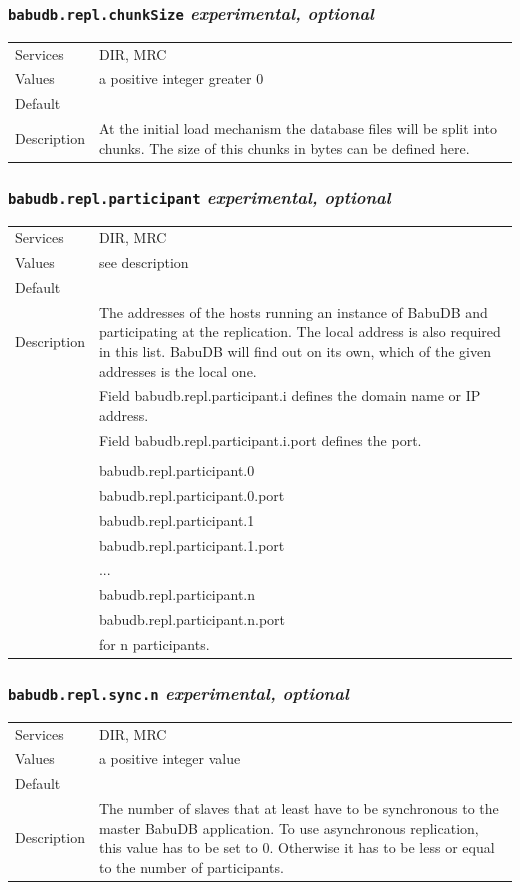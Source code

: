 \documentclass[a4paper,10pt]{book}
\begin{document}
\subsubsection{\texttt{babudb.repl.chunkSize} \textit{experimental, optional}}
\begin{tabular}{lp{10cm}}
 Services & DIR, MRC\\
 Values   & a positive integer greater 0\\
 Default  & \\
 Description & At the initial load mechanism the database files will be split into chunks. The size of this chunks in bytes can be defined here.
\end{tabular}

\subsubsection{\texttt{babudb.repl.participant} \textit{experimental, optional}}
\begin{tabular}{lp{10cm}}
 Services & DIR, MRC\\
 Values   & see description\\
 Default  & \\
 Description & The addresses of the hosts running an instance of BabuDB and participating at the replication. The local address is also required in this list. BabuDB will find out on its own, which of the given addresses is the local one.\\
& Field babudb.repl.participant.i defines the domain name or IP address.\\
& Field babudb.repl.participant.i.port defines the port.\\
& \\
& babudb.repl.participant.0 \\
& babudb.repl.participant.0.port \\
& babudb.repl.participant.1 \\
& babudb.repl.participant.1.port \\
& ... \\
& babudb.repl.participant.n \\
& babudb.repl.participant.n.port \\
& for n participants. \\
\end{tabular} 

\subsubsection{\texttt{babudb.repl.sync.n} \textit{experimental, optional}}
\begin{tabular}{lp{10cm}}
 Services & DIR, MRC\\
 Values   & a positive integer value\\
 Default  & \\
 Description & The number of slaves that at least have to be synchronous to the master BabuDB application. To use asynchronous replication, this value has to be set to 0. Otherwise it has to be less or equal to the number of participants. 
\end{tabular}
\end{document}
